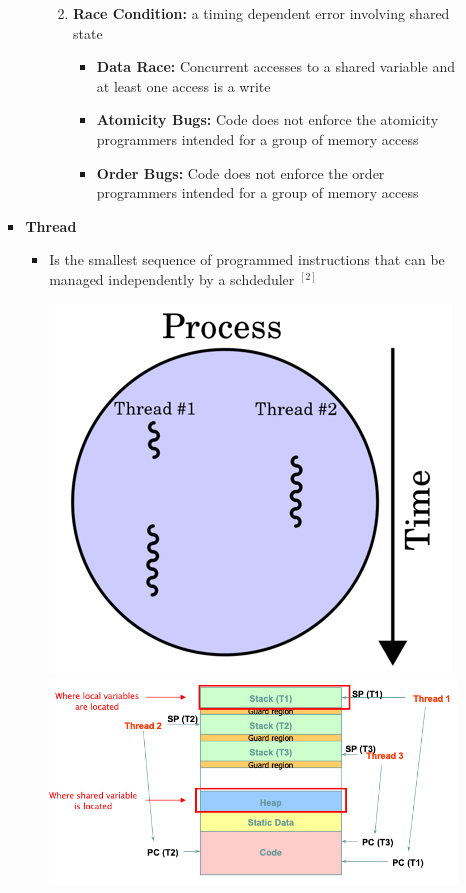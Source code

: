 \documentclass[12pt]{article}
\begin{document}
\begin{enumerate}[1.]
\begin{enumerate}[a)]
\begin{itemize}
\begin{itemize}
\begin{enumerate}[1.]
                    \bigskip

                    \item \textbf{Race Condition:} a timing dependent error
                    involving shared state

                    \begin{itemize}
                        \item \textbf{Data Race:} Concurrent accesses to a shared variable
                        and at least one access is a write
                        \item \textbf{Atomicity Bugs:} Code does not enforce the atomicity
                        programmers intended for a group of memory access
                        \item \textbf{Order Bugs:} Code does not enforce the order programmers
                        intended for a group of memory access
                    \end{itemize}
                \end{enumerate}
            \end{itemize}

            \item \textbf{Thread}

            \begin{itemize}
                \item Is the smallest sequence of programmed instructions that can be managed independently
                by a schdeduler $^{[2]}$

                \begin{center}
                \includegraphics[width=0.4\linewidth]{images/midterm_1_solution_6.png}
                \includegraphics[width=\linewidth]{images/midterm_1_solution_7.png}
                \end{center}


\end{itemize}
\end{itemize}
\end{enumerate}
\end{enumerate}
\end{document}
